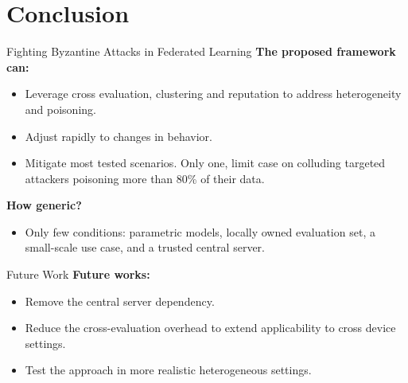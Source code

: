 \section*{Conclusion}

\begin{frame}
  \sectionpage
\end{frame}

\begin{frame}{Fighting Byzantine Attacks in Federated Learning}
  \textbf{The proposed framework can:}
  \begin{itemize}
    \item Leverage cross evaluation, clustering and reputation to address heterogeneity and poisoning.  
    \item Adjust rapidly to changes in behavior.  
    \item Mitigate most tested scenarios. Only one, limit case on colluding targeted attackers poisoning more than 80\% of their data. 
  \end{itemize}


  \pause
  \textbf{How generic?}
  \begin{itemize}
    \item Only few conditions: parametric models, locally owned evaluation set, a \alert<3>{small-scale use case}, and a \alert<3>{trusted central server}.
  \end{itemize}
\end{frame}


\begin{frame}{Future Work}
  \textbf{Future works:}
    \begin{itemize}
      \item Remove the central server dependency.
      \item Reduce the cross-evaluation overhead to extend applicability to cross device settings.
      \item Test the approach in more realistic heterogeneous settings.
    \end{itemize}
\end{frame}


